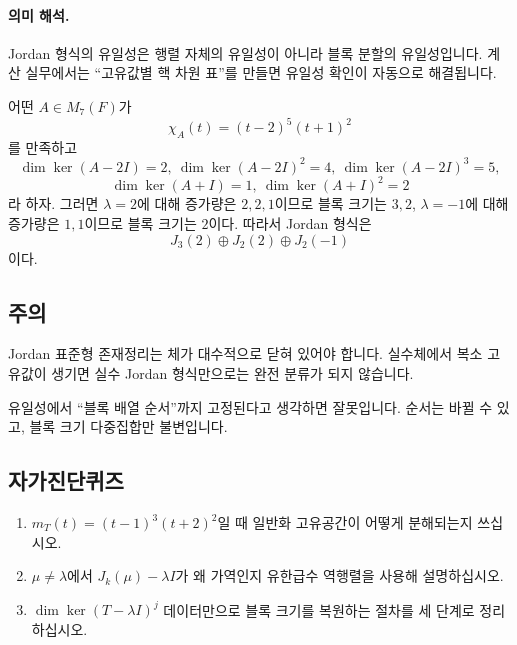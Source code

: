 \paragraph{의미 해석.}
Jordan 형식의 유일성은 행렬 자체의 유일성이 아니라 블록 분할의 유일성입니다. 계산 실무에서는 ``고유값별 핵 차원 표''를 만들면 유일성 확인이 자동으로 해결됩니다.

\begin{example}
어떤 $A\in M_7(F)$가
$$
\chi_A(t)=(t-2)^5(t+1)^2
$$
를 만족하고
$$
\dim\ker(A-2I)=2,\ \dim\ker(A-2I)^2=4,\ \dim\ker(A-2I)^3=5,
$$
$$
\dim\ker(A+I)=1,\ \dim\ker(A+I)^2=2
$$
라 하자. 그러면 $\lambda=2$에 대해 증가량은 $2,2,1$이므로 블록 크기는 $3,2$, $\lambda=-1$에 대해 증가량은 $1,1$이므로 블록 크기는 $2$이다. 따라서 Jordan 형식은
$$
J_3(2)\oplus J_2(2)\oplus J_2(-1)
$$
이다.
\end{example}

\subsection*{주의}
\begin{warning}
Jordan 표준형 존재정리는 체가 대수적으로 닫혀 있어야 합니다. 실수체에서 복소 고유값이 생기면 실수 Jordan 형식만으로는 완전 분류가 되지 않습니다.
\end{warning}
\begin{warning}
유일성에서 ``블록 배열 순서''까지 고정된다고 생각하면 잘못입니다. 순서는 바뀔 수 있고, 블록 크기 다중집합만 불변입니다.
\end{warning}

\subsection*{자가진단퀴즈}
\begin{enumerate}[label=\arabic*.]
\item $m_T(t)=(t-1)^3(t+2)^2$일 때 일반화 고유공간이 어떻게 분해되는지 쓰십시오.
\item $\mu\neq\lambda$에서 $J_k(\mu)-\lambda I$가 왜 가역인지 유한급수 역행렬을 사용해 설명하십시오.
\item $\dim\ker(T-\lambda I)^j$ 데이터만으로 블록 크기를 복원하는 절차를 세 단계로 정리하십시오.
\end{enumerate}


